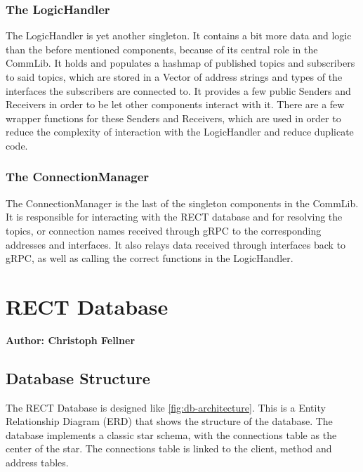 \subsubsection{The LogicHandler}
The LogicHandler is yet another singleton. It contains a bit more data and logic than the before mentioned components, because of its central role in the CommLib.
It holds and populates a hashmap of published topics and subscribers to said topics, which are stored in a Vector of address strings and types of the interfaces the
subscribers are connected to. It provides a few public Senders and Receivers in order to be let other components interact with it. There are a few wrapper functions
for these Senders and Receivers, which are used in order to reduce the complexity of interaction with the LogicHandler and reduce duplicate code.

\subsubsection{The ConnectionManager}
The ConnectionManager is the last of the singleton components in the CommLib. It is responsible for interacting with the RECT database and for resolving the topics, or connection
names received through gRPC to the corresponding addresses and interfaces. It also relays data received through interfaces back to gRPC, as well as
calling the correct functions in the LogicHandler.




\section{RECT Database}
\textbf{Author: Christoph Fellner}

\subsection{Database Structure}

The RECT Database is designed like \ref{fig:db-architecture}. This is a Entity Relationship Diagram (ERD) that shows the structure of the database. The database implements a
classic star schema, with the connections table as the center of the star. The connections table is linked to the client, method and address tables.

